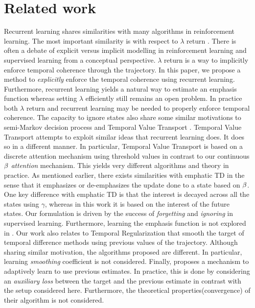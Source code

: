 \section{Related work}
Recurrent learning shares similarities with many algorithms in reinforcement learning. The most important similarity is with respect to $\lambda$ return \cite{sutton1998reinforcement,dayan1992convergence}. There is often a debate of explicit versus implicit modelling in reinforcement learning and supervised learning from a conceptual perspective. $\lambda$ return is a way to implicitly enforce temporal coherence through the trajectory. In this paper, we propose a method to \emph{explicitly} enforce the temporal coherence using recurrent learning. Furthermore, recurrent learning yields a natural way to estimate an emphasis function whereas setting $\lambda$ efficiently still remains an open problem. In practice both $\lambda$ return and recurrent learning may be needed to properly enforce temporal coherence. The capacity to ignore states also share some similar motivations to semi-Markov decision process \cite{puterman1990markov} and Temporal Value Transport \cite{TVT}. Temporal Value Transport attempts to exploit similar ideas that recurrent learning does. It does so in a different manner. In particular, Temporal Value Transport is based on a discrete attention mechanism using threshold values in contrast to our continuous $\beta$ \emph{attention} mechanism. This yields very different algorithms and theory in practice. As mentioned earlier, there exists similarities with emphatic TD \cite{mahmood2015emphatic} in the sense that it emphasizes or de-emphasizes the update done to a state based on $\beta$. One key difference with emphatic TD is that the interest is decayed across all the states using $\gamma$, whereas in this work it is based on the interest of the future states. Our formulation is driven by the success of \emph{forgetting} and \emph{ignoring} in supervised learning. Furthermore, learning the emphasis function is not explored in \cite{mahmood2015emphatic}. Our work also relates to Temporal Regularization \cite{thodoroff2018temporal} that smooth the target of temporal difference methods using previous values of the trajectory. Although sharing similar motivation, the algorithms proposed are different. In particular, learning \emph{smoothing} coefficient is not considered. Finally, \cite{xu2017natural} proposes a mechanism to adaptively learn to use previous estimates. In practice, this is done by considering an \emph{auxiliary loss} between the target and the previous estimate in contrast with the setup considered here. Furthermore, the theoretical properties(convergence) of their algorithm is not considered.


